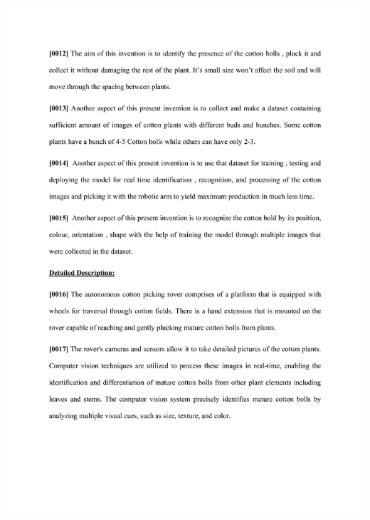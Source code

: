 \documentclass[12pt,a4paper]{report}
\begin{document}
\includegraphics[scale =0.7]{images/patent/patent_doc/output-0002.jpg}
\newpage
\end{document}
